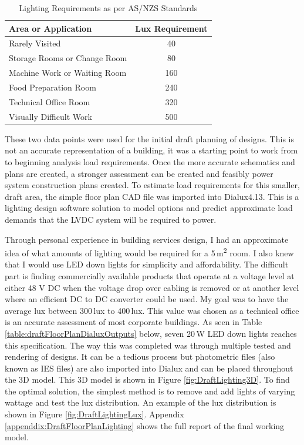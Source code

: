 \begin{table}[H]
\centering
\renewcommand{\arraystretch}{2}
\begin{tabular}{|l|c|}
\hline
\textbf{Area or Application} 	& \textbf{Lux Requirement} \\ \hline
Rarely Visited 					& 40 \\ \hline
Storage Rooms or Change Room 	& 80 \\ \hline
Machine Work or Waiting Room 	& 160 \\ \hline
Food Preparation Room 			& 240 \\ \hline
Technical Office Room 			& 320 \\ \hline
Visually Difficult Work 		& 500 \\ \hline
\end{tabular}
\caption{Lighting Requirements as per AS/NZS Standards \cite{StandardsAustralia2006_2}}
\label{table:LightingRequirements}
\end{table}

These two data points were used for the initial draft planning of designs. This is not an accurate representation of a building, it was a starting point to work from to beginning analysis load requirements. Once the more accurate schematics and plans are created, a stronger assessment can be created and feasibly power system construction plans created. To estimate load requirements for this smaller, draft area, the simple floor plan CAD file was imported into Dialux4.13. This is a lighting design software solution to model options and predict approximate load demands that the LVDC system will be required to power.  
\newline

Through personal experience in building services design, I had an approximate idea of what amounts of lighting would be required for a 5\,\si{m^2} room. I also knew that I would use LED down lights for simplicity and affordability. The difficult part is finding commercially available products that operate at a voltage level at either 48 V DC when the voltage drop over cabling is removed or at another level where an efficient DC to DC converter could be used. My goal was to have the average lux between 300\,\si{lux} to 400\,\si{lux}. This value was chosen as a technical office is an accurate assessment of most corporate buildings. As seen in Table \ref{table:draftFloorPlanDialuxOutputs} below, seven 20\,\si{W} LED down lights reaches this specification. The way this was completed was through multiple tested and rendering of designs. It can be a tedious process but photometric files (also known as IES files) are also imported into Dialux and can be placed throughout the 3D model. This 3D model is shown in Figure \ref{fig:DraftLighting3D}. To find the optimal solution, the simplest method is to remove and add lights of varying wattage and test the lux distribution. An example of the lux distribution is shown in Figure \ref{fig:DraftLightingLux}. Appendix \ref{appenddix:DraftFloorPlanLighting} shows the full report of the final working model.   

